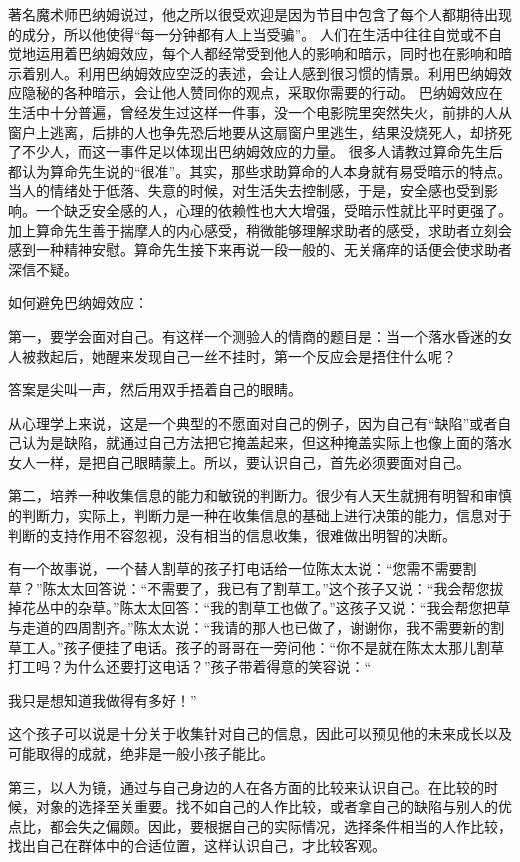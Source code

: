 \documentclass[11pt]{ctexart}
\begin{document}
著名魔术师巴纳姆说过，他之所以很受欢迎是因为节目中包含了每个人都期待出现的成分，所以他使得“每一分钟都有人上当受骗”。
人们在生活中往往自觉或不自觉地运用着巴纳姆效应，每个人都经常受到他人的影响和暗示，同时也在影响和暗示着别人。利用巴纳姆效应空泛的表述，会让人感到很习惯的情景。利用巴纳姆效应隐秘的各种暗示，会让他人赞同你的观点，采取你需要的行动。
巴纳姆效应在生活中十分普遍，曾经发生过这样一件事，没一个电影院里突然失火，前排的人从窗户上逃离，后排的人也争先恐后地要从这扇窗户里逃生，结果没烧死人，却挤死了不少人，而这一事件足以体现出巴纳姆效应的力量。
很多人请教过算命先生后都认为算命先生说的“很准”。其实，那些求助算命的人本身就有易受暗示的特点。当人的情绪处于低落、失意的时候，对生活失去控制感，于是，安全感也受到影响。一个缺乏安全感的人，心理的依赖性也大大增强，受暗示性就比平时更强了。加上算命先生善于揣摩人的内心感受，稍微能够理解求助者的感受，求助者立刻会感到一种精神安慰。算命先生接下来再说一段一般的、无关痛痒的话便会使求助者深信不疑。

如何避免巴纳姆效应：

第一，要学会面对自己。有这样一个测验人的情商的题目是：当一个落水昏迷的女人被救起后，她醒来发现自己一丝不挂时，第一个反应会是捂住什么呢？

答案是尖叫一声，然后用双手捂着自己的眼睛。

从心理学上来说，这是一个典型的不愿面对自己的例子，因为自己有“缺陷”或者自己认为是缺陷，就通过自己方法把它掩盖起来，但这种掩盖实际上也像上面的落水女人一样，是把自己眼睛蒙上。所以，要认识自己，首先必须要面对自己。

第二，培养一种收集信息的能力和敏锐的判断力。很少有人天生就拥有明智和审慎的判断力，实际上，判断力是一种在收集信息的基础上进行决策的能力，信息对于判断的支持作用不容忽视，没有相当的信息收集，很难做出明智的决断。

有一个故事说，一个替人割草的孩子打电话给一位陈太太说：“您需不需要割草？”陈太太回答说：“不需要了，我已有了割草工。”这个孩子又说：“我会帮您拔掉花丛中的杂草。”陈太太回答：“我的割草工也做了。”这孩子又说：“我会帮您把草与走道的四周割齐。”陈太太说：“我请的那人也已做了，谢谢你，我不需要新的割草工人。”孩子便挂了电话。孩子的哥哥在一旁问他：“你不是就在陈太太那儿割草打工吗？为什么还要打这电话？”孩子带着得意的笑容说：“

我只是想知道我做得有多好！”

这个孩子可以说是十分关于收集针对自己的信息，因此可以预见他的未来成长以及可能取得的成就，绝非是一般小孩子能比。

第三，以人为镜，通过与自己身边的人在各方面的比较来认识自己。在比较的时候，对象的选择至关重要。找不如自己的人作比较，或者拿自己的缺陷与别人的优点比，都会失之偏颇。因此，要根据自己的实际情况，选择条件相当的人作比较，找出自己在群体中的合适位置，这样认识自己，才比较客观。
\end{document}
